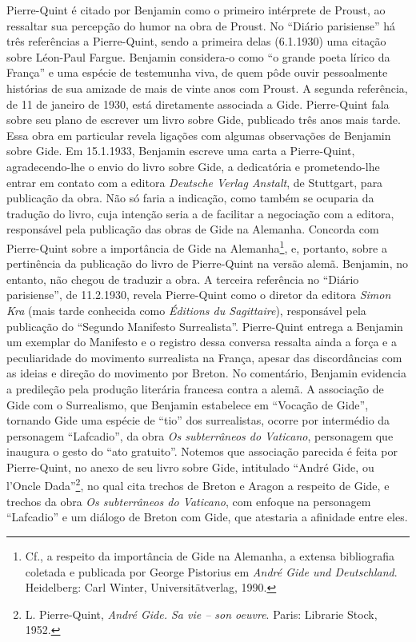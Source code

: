 Pierre-Quint é citado por Benjamin como o primeiro intérprete de Proust,
ao ressaltar sua percepção do humor na obra de Proust. No ``Diário
parisiense'' há três referências a Pierre-Quint, sendo a primeira delas
(6.1.1930) uma citação sobre Léon-Paul Fargue. Benjamin considera-o como
``o grande poeta lírico da França'' e uma espécie de testemunha viva, de
quem pôde ouvir pessoalmente histórias de sua amizade de mais de vinte
anos com Proust. A segunda referência, de 11 de janeiro de 1930, está
diretamente associada a Gide. Pierre-Quint fala sobre seu plano de
escrever um livro sobre Gide, publicado três anos mais tarde. Essa obra
em particular revela ligações com algumas observações de Benjamin sobre
Gide. Em 15.1.1933, Benjamin escreve uma carta a Pierre-Quint,
agradecendo-lhe o envio do livro sobre Gide, a dedicatória e
prometendo-lhe entrar em contato com a editora \emph{Deutsche Verlag
Anstalt}, de Stuttgart, para publicação da obra. Não só faria a
indicação, como também se ocuparia da tradução do livro, cuja intenção
seria a de facilitar a negociação com a editora, responsável pela
publicação das obras de Gide na Alemanha. Concorda com Pierre-Quint
sobre a importância de Gide na Alemanha\footnote{Cf., a respeito da
  importância de Gide na Alemanha, a extensa bibliografia coletada e
  publicada por George Pistorius em \emph{André Gide und Deutschland}.
  Heidelberg: Carl Winter, Universitätverlag, 1990.}, e, portanto, sobre
a pertinência da publicação do livro de Pierre-Quint na versão alemã.
Benjamin, no entanto, não chegou de traduzir a obra. A terceira
referência no ``Diário parisiense'', de 11.2.1930, revela Pierre-Quint
como o diretor da editora \emph{Simon Kra} (mais tarde conhecida como
\emph{Éditions du Sagittaire}), responsável pela publicação do ``Segundo
Manifesto Surrealista''. Pierre-Quint entrega a Benjamin um exemplar do
Manifesto e o registro dessa conversa ressalta ainda a força e a
peculiaridade do movimento surrealista na França, apesar das
discordâncias com as ideias e direção do movimento por Breton. No
comentário, Benjamin evidencia a predileção pela produção literária
francesa contra a alemã. A associação de Gide com o Surrealismo, que
Benjamin estabelece em ``Vocação de Gide'', tornando Gide uma espécie de
``tio'' dos surrealistas, ocorre por intermédio da personagem
``Lafcadio'', da obra \emph{Os subterrâneos do Vaticano}, personagem que
inaugura o gesto do ``ato gratuito''. Notemos que associação parecida é
feita por Pierre-Quint, no anexo de seu livro sobre Gide, intitulado
``André Gide, ou l'Oncle Dada''\footnote{L. Pierre-Quint, \emph{André
  Gide. Sa vie -- son oeuvre}. Paris: Librarie Stock, 1952.}, no qual
cita trechos de Breton e Aragon a respeito de Gide, e trechos da obra
\emph{Os subterrâneos do Vaticano}, com enfoque na personagem
``Lafcadio'' e um diálogo de Breton com Gide, que atestaria a afinidade
entre eles.

